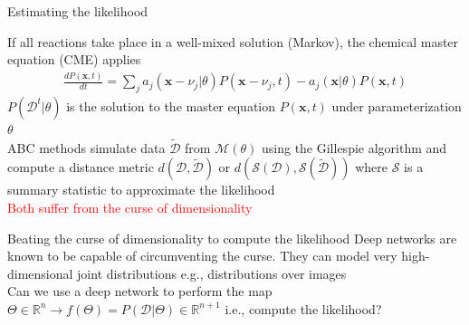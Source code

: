 \documentclass[aspectratio=1610]{beamer}					%
\begin{document}
\begin{frame}{Estimating the likelihood}

If all reactions take place in a well-mixed solution (Markov), the chemical master equation (CME) applies\\
\begin{align*}
\frac{dP(\mathbf{x},t)}{dt} = \sum_{j} a_{j}(\mathbf{x}-\nu_{j}|\theta)P(\mathbf{x}-\nu_{j},t) - a_{j}(\mathbf{x}|\theta)P(\mathbf{x},t)
\end{align*}
$P(\mathcal{D}^{t}|\theta)$ is the solution to the master equation $P(\mathbf{x},t)$ under parameterization $\theta$\\
\vspace{0.2in}
ABC methods simulate data $\tilde{\mathcal{D}}$ from $\mathcal{M}(\theta)$ using the Gillespie algorithm and compute a distance metric $d(\mathcal{D},\tilde{\mathcal{D}})$ or $d(\mathcal{S}(\mathcal{D}),\mathcal{S}(\tilde{\mathcal{D}}))$ where $\mathcal{S}$ is a summary statistic to approximate the likelihood\\
\vspace{0.2in}
\textcolor{red}{Both suffer from the curse of dimensionality}\\
\vspace{0.2in}

\end{frame}

\begin{frame}{Beating the curse of dimensionality to compute the likelihood}
Deep networks are known to be capable of circumventing the curse. They can model very high-dimensional joint distributions e.g., distributions over images\\
\vspace{0.2in}
Can we use a deep network to perform the map $\Theta\in \mathbb{R}^{n} \rightarrow f(\Theta) = P(\mathcal{D}|\Theta) \in \mathbb{R}^{n+1}$ i.e., compute the likelihood?
\end{frame}
\end{document}

